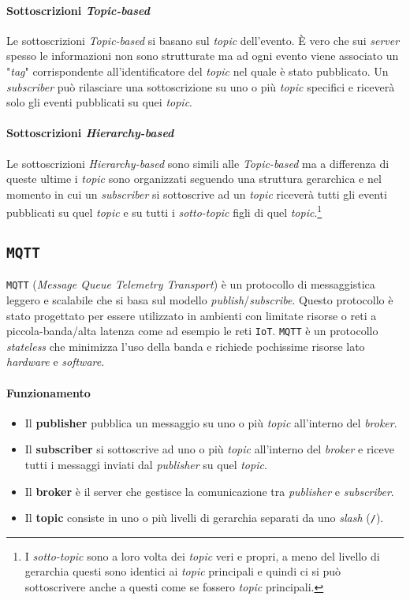             \paragraph{Sottoscrizioni \textit{Topic-based}} Le sottoscrizioni \textit{Topic-based} si basano sul \textit{topic} dell'evento. È vero che sui \textit{server} spesso le informazioni non sono strutturate ma ad ogni evento viene associato un "\textit{tag}" corrispondente all'identificatore del \textit{topic} nel quale è stato pubblicato. Un \textit{subscriber} può rilasciare una sottoscrizione su uno o più \textit{topic} specifici e riceverà solo gli eventi pubblicati su quei \textit{topic}.
            \paragraph{Sottoscrizioni \textit{Hierarchy-based}} Le sottoscrizioni \textit{Hierarchy-based} sono simili alle \textit{Topic-based} ma a differenza di queste ultime i \textit{topic} sono organizzati seguendo una struttura gerarchica e nel momento in cui un \textit{subscriber} si sottoscrive ad un \textit{topic} riceverà tutti gli eventi pubblicati su quel \textit{topic} e su tutti i \textit{sotto-topic} figli di quel \textit{topic}.\footnote{I \textit{sotto-topic} sono a loro volta dei \textit{topic} veri e propri, a meno del livello di gerarchia questi sono identici ai \textit{topic} principali e quindi ci si può sottoscrivere anche a questi come se fossero \textit{topic} principali.}
    \subsection{\texttt{MQTT}}
        \texttt{MQTT} (\textit{Message Queue Telemetry Transport}) è un protocollo di messaggistica leggero e scalabile che si basa sul modello \textit{publish}/\textit{subscribe}. Questo protocollo è stato progettato per essere utilizzato in ambienti con limitate risorse o reti a piccola-banda/alta latenza come ad esempio le reti \texttt{IoT}. \texttt{MQTT} è un protocollo \textit{stateless} che minimizza l'uso della banda e richiede pochissime risorse lato \textit{hardware} e \textit{software}. 
        \paragraph{Funzionamento}
            \begin{itemize}
                \item Il \textbf{publisher} pubblica un messaggio su uno o più \textit{topic} all'interno del \textit{broker}.
                \item Il \textbf{subscriber} si sottoscrive ad uno o più \textit{topic} all'interno del \textit{broker} e riceve tutti i messaggi inviati dal \textit{publisher} su quel \textit{topic}.
                \item Il \textbf{broker} è il server che gestisce la comunicazione tra \textit{publisher} e \textit{subscriber}.
                \item Il \textbf{topic} consiste in uno o più livelli di gerarchia separati da uno \textit{slash} (\texttt{/}).
            \end{itemize}
